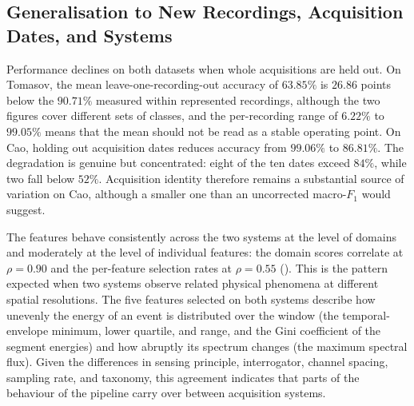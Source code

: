 \subsection{Generalisation to New Recordings, Acquisition Dates, and Systems}
\label{sec:resDiscGeneralisation}
Performance declines on both datasets when whole acquisitions are held out. On Tomasov, the mean leave-one-recording-out accuracy of $63.85\%$ is $26.86$ points below the $90.71\%$ measured within represented recordings, although the two figures cover different sets of classes, and the per-recording range of $6.22\%$ to $99.05\%$ means that the mean should not be read as a stable operating point. On Cao, holding out acquisition dates reduces accuracy from $99.06\%$ to $86.81\%$. The degradation is genuine but concentrated: eight of the ten dates exceed $84\%$, while two fall below $52\%$. Acquisition identity therefore remains a substantial source of variation on Cao, although a smaller one than an uncorrected macro-$F_1$ would suggest.

The features behave consistently across the two systems at the level of domains and moderately at the level of individual features: the domain scores correlate at $\rho = 0.90$ and the per-feature selection rates at $\rho = 0.55$ (). This is the pattern expected when two systems observe related physical phenomena at different spatial resolutions. The five features selected on both systems describe how unevenly the energy of an event is distributed over the window (the temporal-envelope minimum, lower quartile, and range, and the Gini coefficient of the segment energies) and how abruptly its spectrum changes (the maximum spectral flux). Given the differences in sensing principle, interrogator, channel spacing, sampling rate, and taxonomy, this agreement indicates that parts of the behaviour of the pipeline carry over between acquisition systems.


